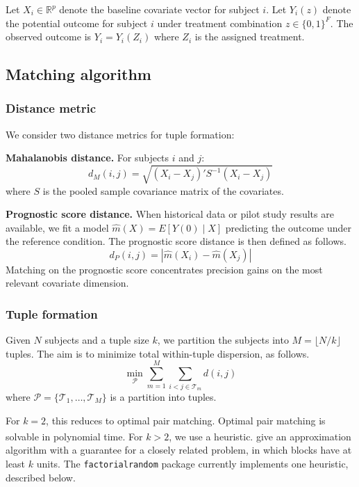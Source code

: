 \documentclass[
  11pt,
]{article}
\begin{document}
Let \(X_i \in \mathbb{R}^p\) denote the baseline covariate
vector for subject \(i\). Let \(Y_i(z)\) denote the potential
outcome for subject \(i\) under treatment combination \(z \in
\{0, 1\}^F\). The observed outcome is \(Y_i = Y_i(Z_i)\) where
\(Z_i\) is the assigned treatment.

\subsection{Matching algorithm}\label{matching-algorithm}

\subsubsection{Distance metric}\label{distance-metric}

We consider two distance metrics for tuple formation:

\textbf{Mahalanobis distance.} For subjects \(i\) and \(j\):
\begin{equation}
  d_M(i,j) = \sqrt{(X_i - X_j)' S^{-1} (X_i - X_j)}
\end{equation}
where \(S\) is the pooled sample covariance matrix of the
covariates.

\textbf{Prognostic score distance.} When historical data or pilot
study results are available, we fit a model \(\hat{m}(X) =
E[Y(0) \mid X]\) predicting the outcome under the reference
condition. The prognostic score distance is then defined as
follows.
\begin{equation}
  d_P(i,j) = |\hat{m}(X_i) - \hat{m}(X_j)|
\end{equation}
Matching on the prognostic score concentrates precision gains
on the most relevant covariate dimension.

\subsubsection{Tuple formation}\label{tuple-formation}

Given \(N\) subjects and a tuple size \(k\), we partition the
subjects into \(M = \lfloor N/k \rfloor\) tuples. The aim is to
minimize total within-tuple dispersion, as follows.
\begin{equation}
  \min_{\mathcal{P}} \sum_{m=1}^{M}
    \sum_{i < j \in \mathcal{T}_m} d(i,j)
\end{equation}
where \(\mathcal{P} = \{\mathcal{T}_1, \ldots,
\mathcal{T}_M\}\) is a partition into tuples.

For \(k = 2\), this reduces to optimal pair matching. Optimal
pair matching is solvable in polynomial time. For \(k > 2\),
we use a heuristic.\textsuperscript{} give an approximation
algorithm with a guarantee for a closely related problem,
in which blocks have at least \(k\) units. The
\texttt{factorialrandom} package currently implements one
heuristic, described below.
\end{document}

